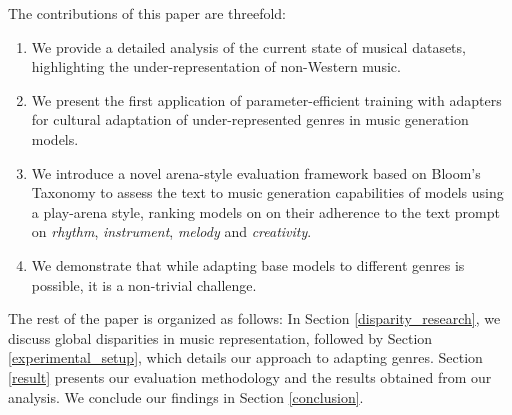 The contributions of this paper are threefold:

\begin{enumerate}
\setlength{\parskip}{0pt}
    \item We provide a detailed analysis of the current state of musical datasets, highlighting the under-representation of non-Western music.
    \item We present the first application of parameter-efficient training with adapters for cultural adaptation of under-represented genres in music generation models. 
    \item We introduce a novel arena-style evaluation framework based on Bloom's Taxonomy to assess the text to music generation capabilities of models using a play-arena style, ranking models on on their adherence to the text prompt on \textit{rhythm}, \textit{instrument}, \textit{melody} and \textit{creativity}.
    \item We demonstrate that while adapting base models to different genres is possible, it is a non-trivial challenge.
\end{enumerate}
The rest of the paper is organized as follows: In Section \ref{disparity_research}, we discuss global disparities in music representation, followed by Section \ref{experimental_setup}, which details our approach to adapting genres. Section \ref{result} presents our evaluation methodology and the results obtained from our analysis. We conclude our findings in Section \ref{conclusion}.